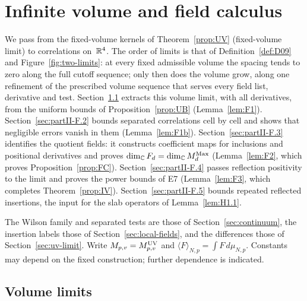 \section{Infinite volume and field calculus}\label{sec:partII-F}

We pass from the fixed-volume kernels of Theorem~\ref{prop:UV} (fixed-volume limit) to correlations on~$\mathbb{R}^4$. The order of limits is that of Definition~\ref{def:D09} and Figure~\ref{fig:two-limits}: at every fixed admissible volume the spacing tends to zero along the full cutoff sequence; only then does the volume grow, along one refinement of the prescribed volume sequence that serves every field list, derivative and test. Section~\ref{sec:partII-F.1} extracts this volume limit, with all derivatives, from the uniform bounds of Proposition~\ref{prop:UB} (Lemma~\ref{lem:F1}). Section~\ref{sec:partII-F.2} bounds separated correlations cell by cell and shows that negligible errors vanish in them (Lemma~\ref{lem:F1b}). Section~\ref{sec:partII-F.3} identifies the quotient fields: it constructs coefficient maps for inclusions and positional derivatives and proves $\dim_{\mathbb{C}} F_d=\dim_{\mathbb{C}}M_{d}^{\mathrm{Max}}$ (Lemma~\ref{lem:F2}, which proves Proposition~\ref{prop:FC}). Section~\ref{sec:partII-F.4} passes reflection positivity to the limit and proves the power bounds of E7 (Lemma~\ref{lem:F3}, which completes Theorem~\ref{prop:IV}). Section~\ref{sec:partII-F.5} bounds repeated reflected insertions, the input for the slab operators of Lemma~\ref{lem:H1.1}.

The Wilson family and separated tests are those of Section~\ref{sec:continuum}, the insertion labels those of Section~\ref{sec:local-fields}, and the differences those of Section~\ref{sec:uv-limit}. Write $M_{p,v}=M^{\rm UV}_{p,v}$ and $\langle F\rangle_{N,p}=\int F\,d\mu_{N,p}$. Constants may depend on the fixed construction; further dependence is indicated.

\subsection{Volume limits}\label{sec:partII-F.1}

